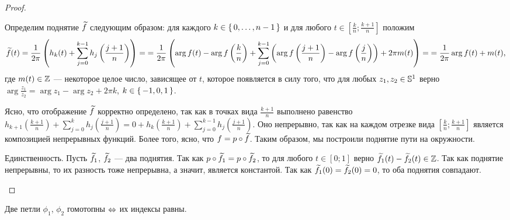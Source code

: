 \documentclass[main]{subfiles}
\begin{document}
\begin{proof}
\begin{phased}
			Определим поднятие $ \Up{f} $ следующим образом: для каждого $ k \in \Set{0, \ldots, n - 1} $ и для
			любого $ t \in \left[ \frac{k}{n}; \frac{k + 1}{n} \right] $ положим
			\begin{dmath*}
				\Up{f}(t) =
				{ \frac{1}{2 \pi} \left( h_k(t) + \sum_{j = 0}^{k-1} h_j \left( \frac{j+1}{n} \right) \right) = }
				= {  \frac{1}{2 \pi} \left( \arg f(t) - \arg f \left( \frac{k}{n} \right) +
					\sum_{j = 0}^{k-1} \left(  \arg f \left(\frac{j+1}{n} \right) -
						\arg f \left( \frac{j}{n} \right) \right)
					+ 2 \pi m(t) \right) = }
				= {  \frac{1}{2 \pi } \arg f(t) + m(t) },
			\end{dmath*}
			где $ m(t) \in \Z $ --- некоторое целое число, зависящее от $ t $, которое появляется в силу того,
			что для любых $ z_1, z_2 \in \S^1 $
			верно $ \arg \frac{z_1}{z_2} = \arg z_1 - \arg z_2 + 2 \pi k $, $ k \in \Set{-1, 0, 1} $.

			Ясно, что отображение $ \Up{f} $ корректно определено, так как в точках вида $ \frac{k + 1}{n} $ выполнено
			равенство
				$ h_{k + 1} \left( \frac{k + 1}{n} \right) + \sum_{j = 0}^{k} h_j \left( \frac{j + 1}{n} \right)
				= 0 + h_k \left( \frac{k+1}{n} \right) + \sum_{j = 0}^{k-1} h_j \left( \frac{j + 1}{n} \right) $.
			Оно непрерывно, так как
			на каждом отрезке вида $ \left[ \frac{k}{n}; \frac{k + 1}{n} \right] $ является композицией непрерывных
			функций. Более того, ясно, что $ f = p \circ \Up{f} $. Таким образом, мы построили поднятие пути
			на окружности.
		\item[Единственность.] Пусть $ \Up{f}_1 $, $ \Up{f}_2$ --- два поднятия. Так как
			$ p \circ \Up{f}_1 = p \circ \Up{f}_2 $, то для любого $ t \in [0; 1] $ верно
			$ \Up{f}_1(t) - \Up{f}_2(t) \in \Z $. Так как поднятие непрерывны, то их разность тоже непрерывна,
			а значит, является константой. Так как $ \Up{f}_1(0) = \Up{f}_2(0) = 0 $, то оба поднятия совпадают.
	\end{phased}
\end{proof}

\begin{lemma} \label{lem.6.1}
	Две петли $ \phi_1 $, $ \phi_2 $ гомотопны $\iaoi$ их индексы равны.
\end{lemma}
\end{document}
